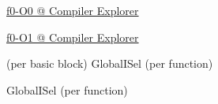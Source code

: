 \begin{frame}{}
  \begin{center}
    \href{https://godbolt.org/z/4jbbabM6x}{f0-O0 @ Compiler Explorer}
  \end{center}
\end{frame}

\begin{frame}{}
  \begin{center}
    \href{https://godbolt.org/z/c7PrEK4c7}{f0-O1 @ Compiler Explorer}
  \end{center}
\end{frame}

\begin{frame}{}
  \begin{center}
  \end{center}
\end{frame}

\begin{frame}{}
  \begin{center}
     \quad {} (per basic block) \quad GlobalISel (per function)


    GlobalISel (per function)
  \end{center}
\end{frame}
